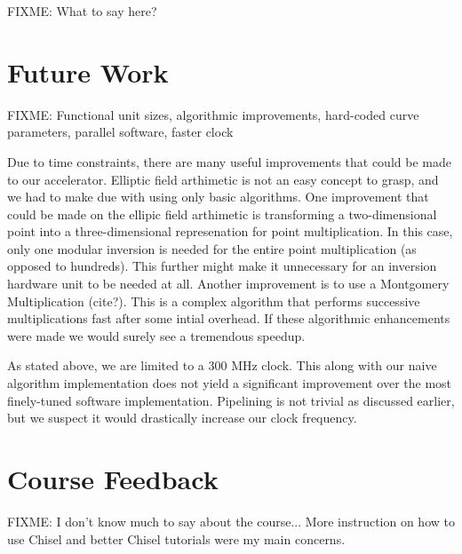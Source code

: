 \documentclass[twocolumn]{article}
\begin{document}
FIXME: What to say here?

\section{Future Work}

FIXME: Functional unit sizes, algorithmic improvements, hard-coded
curve parameters, parallel software, faster clock

Due to time constraints, there are many useful improvements that could be made
to our accelerator. Elliptic field arthimetic is not an easy concept to grasp, and
we had to make due with using only basic algorithms. One improvement that could be made
on the ellipic field arthimetic is transforming a two-dimensional point into a three-dimensional
represenation for point multiplication. In this case, only one modular inversion is needed
for the entire point multiplication (as opposed to hundreds). This further might make it 
unnecessary for an inversion hardware unit to be needed at all. Another improvement is to use
a Montgomery Multiplication (cite?). This is a complex algorithm that performs successive 
multiplications fast after some intial overhead. If these algorithmic enhancements were made we
would surely see a tremendous speedup.

As stated above, we are limited to a 300 MHz clock. This along with our naive algorithm implementation 
does not yield a significant improvement over the most finely-tuned software implementation. Pipelining 
is not trivial as discussed earlier, but we suspect it would drastically increase our clock frequency. 




\section{Course Feedback}

FIXME: I don't know much to say about the course... More instruction on how to use Chisel
and better Chisel tutorials were my main concerns.



\end{document}
